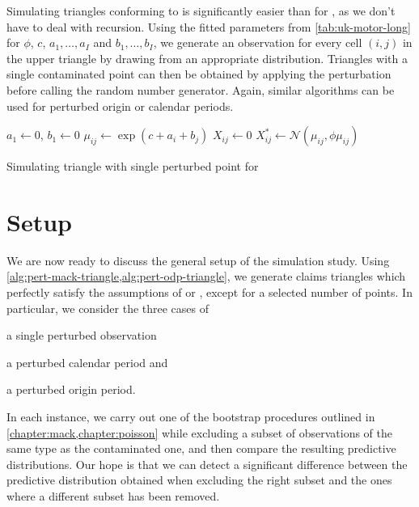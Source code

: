 \documentclass[a4paper]{book}
\begin{document}
Simulating triangles conforming to  is significantly easier than for , as we don't have to deal with recursion. Using the fitted parameters from \cref{tab:uk-motor-long} for $\phi$, $c$, $a_1, \dots, a_I$ and $b_1, \dots, b_I$, we generate an observation for every cell $(i, j)$ in the upper triangle by drawing from an appropriate distribution. Triangles with a single contaminated point can then be obtained by applying the perturbation before calling the random number generator. Again, similar algorithms can be used for perturbed origin or calendar periods.

\begin{algorithm}[!htb]
  \begin{algorithmic}
    \State $a_1 \gets 0$, $b_1 \gets 0$
      \State $\mu_{ij} \gets \exp(c + a_i + b_j)$
      \State $X_{ij} \gets 0$
    \EndFor
        \State $X^*_{ij} \gets \mathcal{N}(\mu_{ij}, \phi \mu_{ij})$
      \EndFor
    \EndFor
    \State {}
  \end{algorithmic}
  \caption{Simulating triangle with single perturbed point for }
  \label{alg:pert-odp-triangle}
\end{algorithm}

\section{Setup}

We are now ready to discuss the general setup of the simulation study. Using \cref{alg:pert-mack-triangle,alg:pert-odp-triangle}, we generate claims triangles which perfectly satisfy the assumptions of  or , except for a selected number of points. In particular, we consider the three cases of
\begin{inparaenum}[(i)]
  \item a single perturbed observation
  \item a perturbed calendar period and
  \item a perturbed origin period.
\end{inparaenum}
In each instance, we carry out one of the bootstrap procedures outlined in \cref{chapter:mack,chapter:poisson} while excluding a subset of observations of the same type as the contaminated one, and then compare the resulting predictive distributions. Our hope is that we can detect a significant difference between the predictive distribution obtained when excluding the right subset and the ones where a different subset has been removed.
\end{document}
